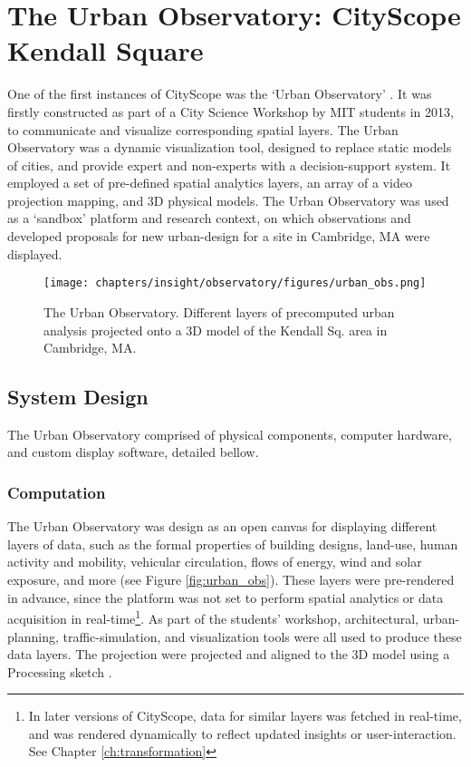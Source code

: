 
\section{The Urban Observatory: CityScope Kendall Square}

 {
  One of the first instances of CityScope was the `Urban Observatory' \cite{Hadhrawi2016}. It was firstly constructed as part of a City Science Workshop by MIT students in 2013, to communicate and visualize corresponding spatial layers. The Urban Observatory was a dynamic visualization tool, designed to replace static models of cities, and provide expert and non-experts with a decision-support system. It employed a set of pre-defined spatial analytics layers, an array of a video projection mapping, and 3D physical models. The Urban Observatory was used as a `sandbox' platform and research context, on which observations and developed proposals for new urban-design for a site in Cambridge, MA were displayed.

  \begin{figure}[h]
      \begin{center}
          \texttt{[image: chapters/insight/observatory/figures/urban\_obs.png]}
      \end{center}
      \caption{The Urban Observatory. Different layers of precomputed urban analysis projected onto a 3D model of the Kendall Sq. area in Cambridge, MA.}
      \label{fig:urban_obs}
  \end{figure}

  \subsection{System Design}
  {
      The Urban Observatory comprised of physical components, computer hardware, and custom display software, detailed bellow.

      \subsubsection{Computation}{\label{sec:computational-models}}
      {
          The Urban Observatory was design as an open canvas for displaying different layers of data, such as the formal properties of building designs, land-use, human activity and mobility, vehicular circulation, flows of energy, wind and solar exposure, and more (see Figure \eqref{fig:urban_obs}). These layers were pre-rendered in advance, since the platform was not set to perform spatial analytics or data acquisition in real-time\footnote{In later versions of CityScope, data for similar layers was fetched in real-time, and was rendered dynamically to reflect updated insights or user-interaction. See Chapter \eqref{ch:transformation}}. As part of the students' workshop, architectural, urban-planning, traffic-simulation, and visualization tools were all used to produce these data layers. The projection were projected and aligned to the 3D model using a Processing sketch \cite{reas2007processing}.
      }

}}
